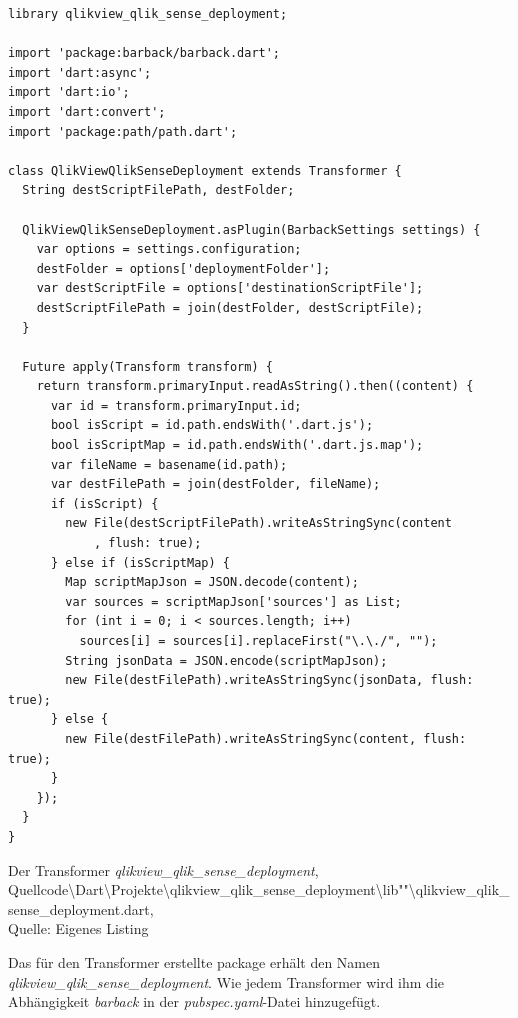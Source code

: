 \begin{listing}[htbp]
\begin{verbatim}
library qlikview_qlik_sense_deployment;

import 'package:barback/barback.dart';
import 'dart:async';
import 'dart:io';
import 'dart:convert';
import 'package:path/path.dart';

class QlikViewQlikSenseDeployment extends Transformer {
  String destScriptFilePath, destFolder;

  QlikViewQlikSenseDeployment.asPlugin(BarbackSettings settings) {
    var options = settings.configuration;
    destFolder = options['deploymentFolder'];
    var destScriptFile = options['destinationScriptFile'];
    destScriptFilePath = join(destFolder, destScriptFile);
  }

  Future apply(Transform transform) {
    return transform.primaryInput.readAsString().then((content) {
      var id = transform.primaryInput.id;
      bool isScript = id.path.endsWith('.dart.js');
      bool isScriptMap = id.path.endsWith('.dart.js.map');
      var fileName = basename(id.path);
      var destFilePath = join(destFolder, fileName);
      if (isScript) {
        new File(destScriptFilePath).writeAsStringSync(content
            , flush: true);
      } else if (isScriptMap) {
        Map scriptMapJson = JSON.decode(content);
        var sources = scriptMapJson['sources'] as List;
        for (int i = 0; i < sources.length; i++) 
          sources[i] = sources[i].replaceFirst("\.\./", "");
        String jsonData = JSON.encode(scriptMapJson);
        new File(destFilePath).writeAsStringSync(jsonData, flush: true);
      } else {
        new File(destFilePath).writeAsStringSync(content, flush: true);
      }
    });
  }
}
\end{verbatim}
\caption[Der Transformer \textit{qlikview\_qlik\_sense\_deployment}]{Der Transformer \textit{qlikview\_qlik\_sense\_deployment}, \\Quellcode\textbackslash{}Dart\textbackslash{}Projekte\textbackslash{}qlikview\_qlik\_sense\_deployment\textbackslash{}lib""\textbackslash{}qlikview\_qlik\_sense\_deployment.dart, \\Quelle: Eigenes Listing}
\label{lst:QlikviewQlikSenseDeployment}
\end{listing}


Das für den Transformer erstellte package erhält den Namen \textit{qlikview\_qlik\_sense\_deployment}. Wie jedem Transformer wird ihm die Abhängig\-keit \textit{barback} in der \textit{pubspec.yaml}-Datei hinzugefügt.

